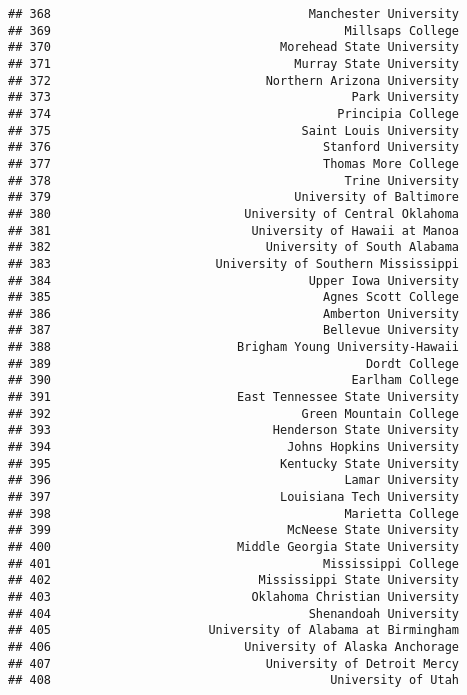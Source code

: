 \documentclass[
]{article}
\begin{document}
\begin{verbatim}
## 368                                    Manchester University
## 369                                         Millsaps College
## 370                                Morehead State University
## 371                                  Murray State University
## 372                              Northern Arizona University
## 373                                          Park University
## 374                                        Principia College
## 375                                   Saint Louis University
## 376                                      Stanford University
## 377                                      Thomas More College
## 378                                         Trine University
## 379                                  University of Baltimore
## 380                           University of Central Oklahoma
## 381                            University of Hawaii at Manoa
## 382                              University of South Alabama
## 383                       University of Southern Mississippi
## 384                                    Upper Iowa University
## 385                                      Agnes Scott College
## 386                                      Amberton University
## 387                                      Bellevue University
## 388                          Brigham Young University-Hawaii
## 389                                            Dordt College
## 390                                          Earlham College
## 391                          East Tennessee State University
## 392                                   Green Mountain College
## 393                               Henderson State University
## 394                                 Johns Hopkins University
## 395                                Kentucky State University
## 396                                         Lamar University
## 397                                Louisiana Tech University
## 398                                         Marietta College
## 399                                 McNeese State University
## 400                          Middle Georgia State University
## 401                                      Mississippi College
## 402                             Mississippi State University
## 403                            Oklahoma Christian University
## 404                                    Shenandoah University
## 405                      University of Alabama at Birmingham
## 406                           University of Alaska Anchorage
## 407                              University of Detroit Mercy
## 408                                       University of Utah

\end{verbatim}
\end{document}

